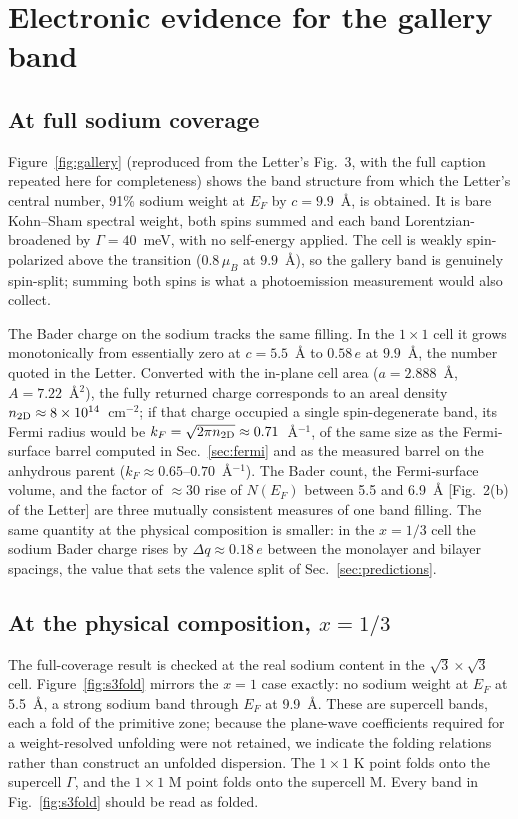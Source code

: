 \documentclass[aps,10pt,preprint,superscriptaddress,floatfix]{revtex4-2}
\begin{document}
\FloatBarrier
\section{Electronic evidence for the gallery band}
\label{sec:electronic}

\subsection{At full sodium coverage}

Figure~\ref{fig:gallery} (reproduced from the Letter's Fig.~3, with the full caption repeated here
for completeness) shows the band structure from which the Letter's central number, 91\% sodium
weight at $E_F$ by $c=9.9$~\AA, is obtained. It is bare Kohn--Sham spectral weight, both spins summed and each band
Lorentzian-broadened by $\Gamma=40$~meV, with no self-energy applied. The cell is weakly
spin-polarized above the transition ($0.8\,\mu_B$ at $9.9$~\AA), so the gallery band is genuinely
spin-split; summing both spins is what a photoemission measurement would also collect.

The Bader charge on the sodium tracks the same filling. In the $1\times1$ cell it grows
monotonically from essentially zero at $c=5.5$~\AA{} to $0.58\,e$ at $9.9$~\AA, the number quoted
in the Letter. Converted with the in-plane cell area ($a=2.888$~\AA, $A=7.22$~\AA$^2$), the fully
returned charge corresponds to an areal density $n_{\rm 2D}\approx8\times10^{14}$~cm$^{-2}$; if
that charge occupied a single spin-degenerate band, its Fermi radius would be
$k_F=\sqrt{2\pi n_{\rm 2D}}\approx0.71$~\AA$^{-1}$, of the same size as the Fermi-surface barrel
computed in Sec.~\ref{sec:fermi} and as the measured barrel on the anhydrous parent
($k_F\approx0.65$--$0.70$~\AA$^{-1}$). The Bader count, the Fermi-surface volume, and the factor
of $\approx30$ rise of $N(E_F)$ between 5.5 and 6.9~\AA{} [Fig.~2(b) of the Letter] are three
mutually consistent measures of one band filling. The same quantity at the physical composition is
smaller: in the $x=1/3$ cell the sodium Bader charge rises by $\Delta q\approx0.18\,e$ between the
monolayer and bilayer spacings, the value that sets the valence split of
Sec.~\ref{sec:predictions}.

\subsection{At the physical composition, $x=1/3$}
\label{sec:galleryfold}

The full-coverage result is checked at the real sodium content in the $\sqrt3\times\sqrt3$ cell.
Figure~\ref{fig:s3fold} mirrors the $x=1$ case exactly: no sodium weight at $E_F$ at 5.5~\AA, a
strong sodium band through $E_F$ at 9.9~\AA. These are supercell bands, each a fold of the
primitive zone; because the plane-wave coefficients required for a weight-resolved unfolding were
not retained, we indicate the folding relations rather than construct an unfolded dispersion. The $1\times1$ K point
folds onto the supercell $\Gamma$, and the $1\times1$ M point folds onto the supercell M. Every band
in Fig.~\ref{fig:s3fold} should be read as folded.
\end{document}
